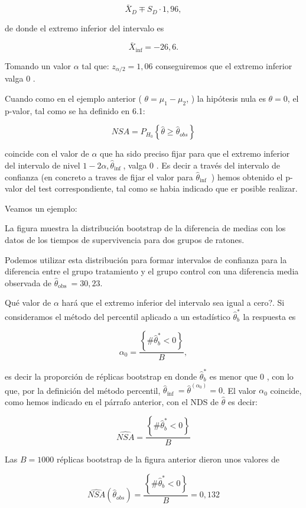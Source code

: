 \documentclass[
]{article}
\begin{document}
\[
\bar{X}_{D} \mp S_{D} \cdot 1,96,
\]

de donde el extremo inferior del intervalo es

\[
\bar{X}_{\mathrm{inf}}=-26,6 .
\]

Tomando un valor \(\alpha\) tal que: \(z_{\alpha / 2}=1,06\) conseguiremos que el extremo inferior valga 0 .

Cuando como en el ejemplo anterior ( \(\theta=\mu_{1}-\mu_{2}\), ) la hipótesis nula es \(\theta=0\), el p-valor, tal como se ha definido en 6.1:

\[
N S A=P_{H_{0}}\left\{\hat{\theta} \geq \hat{\theta}_{o b s}\right\}
\]

coincide con el valor de \(\alpha\) que ha sido preciso fijar para que el extremo inferior del intervalo de nivel \(1-2 \alpha, \hat{\theta}_{\text {inf }}\), valga 0 . Es decir a través del intervalo de confianza (en concreto a traves de fijar el valor para \(\hat{\theta}_{\text {inf }}\) ) hemos obtenido el p-valor del test correspondiente, tal como se habia indicado que er posible realizar.

Veamos un ejemplo:

La figura muestra la distribución bootstrap de la diferencia de medias con los datos de los tiempos de supervivencia para dos grupos de ratones.

Podemos utilizar esta distribución para formar intervalos de confianza para la diferencia entre el grupo tratamiento y el grupo control con una diferencia media observada de \(\hat{\theta}_{\text {obs }}=30,23\).

Qué valor de \(\alpha\) hará que el extremo inferior del intervalo sea igual a cero?. Si consideramos el método del percentil aplicado a un estadístico \(\hat{\theta}_{b}^{*}\) la respuesta es

\[
\alpha_{0}=\frac{\left\{\# \hat{\theta}_{b}^{*}<0\right\}}{B},
\]

es decir la proporción de réplicas bootstrap en donde \(\hat{\theta}_{b}^{*}\) es menor que 0 , con lo que, por la definición del método percentil, \(\hat{\theta}_{\text {ínf }}=\hat{\theta}^{\left(\alpha_{0}\right)}=0\). El valor \(\alpha_{0}\) coincide, como hemos indicado en el párrafo anterior, con el NDS de \(\hat{\theta}\) es decir:

\[
\widehat{N S A}=\frac{\left\{\# \hat{\theta}_{b}^{*}<0\right\}}{B}
\]

Las \(B=1000\) réplicas bootstrap de la figura anterior dieron unos valores de

\[
\widehat{N S A}\left(\hat{\theta}_{o b s}\right)=\frac{\left\{\# \hat{\theta}_{b}^{*}<0\right\}}{B}=0,132
\]
\end{document}
